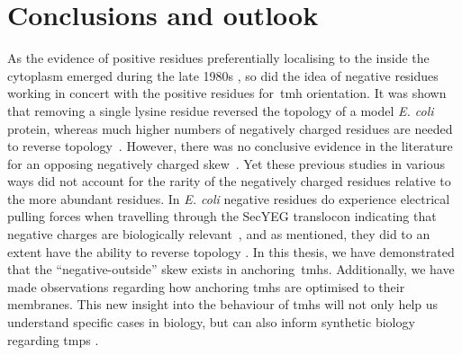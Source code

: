 \chapter{Conclusions and outlook}

\sloppy
As the evidence of positive residues preferentially localising to the inside the cytoplasm emerged during the late 1980s \cite{VonHeijne1989}, so did the idea of negative residues working in concert with the positive residues for~\gls{tmh} orientation.
It was shown that removing a single lysine residue reversed the topology of a model \textit{E. coli} protein, whereas much higher numbers of negatively charged residues are needed to reverse topology~\cite{Nilsson1990}.
However, there was no conclusive evidence in the literature for an opposing negatively charged skew~\cite{Granseth2005, Nilsson2005a, Sharpe2010, Baeza-Delgado2013, Pogozheva2013}.
Yet these previous studies in various ways did not account for the rarity of the negatively charged residues relative to the more abundant residues.
In \textit{E. coli} negative residues do experience electrical pulling forces when travelling through the SecYEG translocon indicating that negative charges are biologically relevant~\cite{Ismail2015}, and as mentioned, they did to an extent have the ability to reverse topology \cite{Nilsson1990}.
In this thesis, we have demonstrated that the ``negative\--outside'' skew exists in anchoring~\gls{tmh}s.
Additionally, we have made observations regarding how anchoring \gls{tmh}s are optimised to their membranes.
This new insight into the behaviour of \gls{tmh}s will not only help us understand specific cases in biology, but can also inform synthetic biology regarding \gls{tmp}s \cite{Kang2018, Findlay2017, Lu2018}.

